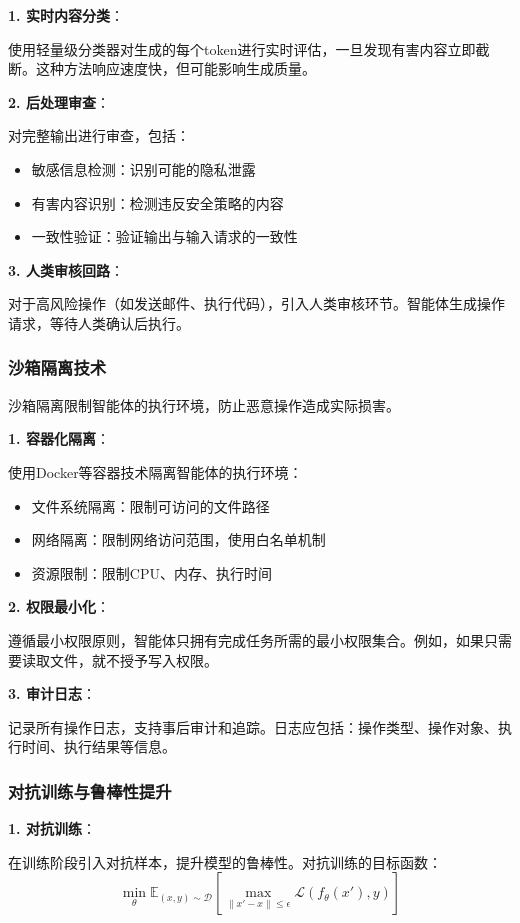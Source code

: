 \textbf{1. 实时内容分类}：

使用轻量级分类器对生成的每个token进行实时评估，一旦发现有害内容立即截断。这种方法响应速度快，但可能影响生成质量。

\textbf{2. 后处理审查}：

对完整输出进行审查，包括：
\begin{itemize}[leftmargin=2em]
    \item 敏感信息检测：识别可能的隐私泄露
    \item 有害内容识别：检测违反安全策略的内容
    \item 一致性验证：验证输出与输入请求的一致性
\end{itemize}

\textbf{3. 人类审核回路}：

对于高风险操作（如发送邮件、执行代码），引入人类审核环节。智能体生成操作请求，等待人类确认后执行。

\subsubsection{沙箱隔离技术}

沙箱隔离限制智能体的执行环境，防止恶意操作造成实际损害。

\textbf{1. 容器化隔离}：

使用Docker等容器技术隔离智能体的执行环境：
\begin{itemize}[leftmargin=2em]
    \item 文件系统隔离：限制可访问的文件路径
    \item 网络隔离：限制网络访问范围，使用白名单机制
    \item 资源限制：限制CPU、内存、执行时间
\end{itemize}

\textbf{2. 权限最小化}：

遵循最小权限原则，智能体只拥有完成任务所需的最小权限集合。例如，如果只需要读取文件，就不授予写入权限。

\textbf{3. 审计日志}：

记录所有操作日志，支持事后审计和追踪。日志应包括：操作类型、操作对象、执行时间、执行结果等信息。

\subsubsection{对抗训练与鲁棒性提升}

\textbf{1. 对抗训练}：

在训练阶段引入对抗样本，提升模型的鲁棒性。对抗训练的目标函数：
\begin{equation}
    \min_{\theta} \mathbb{E}_{(x,y) \sim \mathcal{D}} \left[ \max_{\|x' - x\| \leq \epsilon} \mathcal{L}(f_{\theta}(x'), y) \right]
\end{equation}

